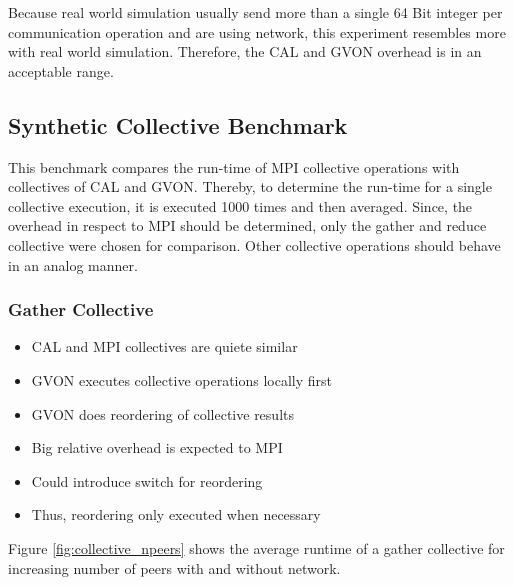 \noindent Because real world simulation usually send more than a single 64 Bit
integer per communication operation and are using network, this
experiment resembles more with real world simulation. Therefore, the
CAL and GVON overhead is in an acceptable range.



\subsection{Synthetic Collective Benchmark}
This benchmark compares the run-time of MPI collective operations with
collectives of CAL and GVON.  Thereby, to determine the run-time for a
single collective execution, it is executed 1000 times and then
averaged. Since, the overhead in respect to MPI should be determined,
only the gather and reduce collective were chosen for comparison. Other
collective operations should behave in an analog manner.


\subsubsection*{Gather Collective}

\begin{itemize}
  \item CAL and MPI collectives are quiete similar
  \item GVON executes collective operations locally first
  \item GVON does reordering of collective results
  \item Big relative overhead is expected to MPI
  \item Could introduce switch for reordering
  \item Thus, reordering only executed when necessary
\end{itemize}

Figure \ref{fig:collective_npeers} shows the average runtime of a
gather collective for increasing number of peers with and without network.

